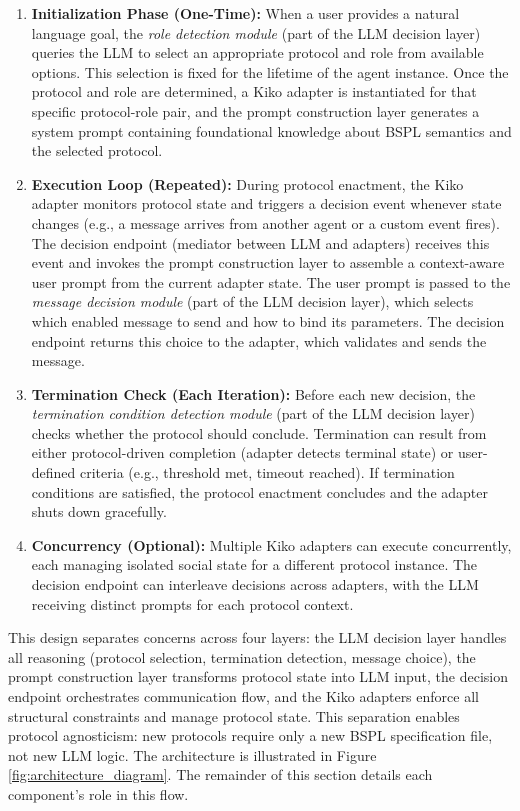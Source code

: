 \documentclass[runningheads]{llncs}
\begin{document}
\begin{enumerate}
    \item \textbf{Initialization Phase (One-Time):} When a user provides a natural language goal, the \emph{role detection module} (part of the LLM decision layer) queries the LLM to select an appropriate protocol and role from available options. This selection is fixed for the lifetime of the agent instance. Once the protocol and role are determined, a Kiko adapter is instantiated for that specific protocol-role pair, and the prompt construction layer generates a system prompt containing foundational knowledge about BSPL semantics and the selected protocol.
    
    \item \textbf{Execution Loop (Repeated):} During protocol enactment, the Kiko adapter monitors protocol state and triggers a decision event whenever state changes (e.g., a message arrives from another agent or a custom event fires). The decision endpoint (mediator between LLM and adapters) receives this event and invokes the prompt construction layer to assemble a context-aware user prompt from the current adapter state. The user prompt is passed to the \emph{message decision module} (part of the LLM decision layer), which selects which enabled message to send and how to bind its parameters. The decision endpoint returns this choice to the adapter, which validates and sends the message.
    
    \item \textbf{Termination Check (Each Iteration):} Before each new decision, the \emph{termination condition detection module} (part of the LLM decision layer) checks whether the protocol should conclude. Termination can result from either protocol-driven completion (adapter detects terminal state) or user-defined criteria (e.g., threshold met, timeout reached). If termination conditions are satisfied, the protocol enactment concludes and the adapter shuts down gracefully.
    
    \item \textbf{Concurrency (Optional):} Multiple Kiko adapters can execute concurrently, each managing isolated social state for a different protocol instance. The decision endpoint can interleave decisions across adapters, with the LLM receiving distinct prompts for each protocol context.
\end{enumerate}

This design separates concerns across four layers: the LLM decision layer handles all reasoning (protocol selection, termination detection, message choice), the prompt construction layer transforms protocol state into LLM input, the decision endpoint orchestrates communication flow, and the Kiko adapters enforce all structural constraints and manage protocol state. 
This separation enables protocol agnosticism: new protocols require only a new BSPL specification file, not new LLM logic.
The architecture is illustrated in Figure \ref{fig:architecture_diagram}.
The remainder of this section details each component's role in this flow.
\end{document}

